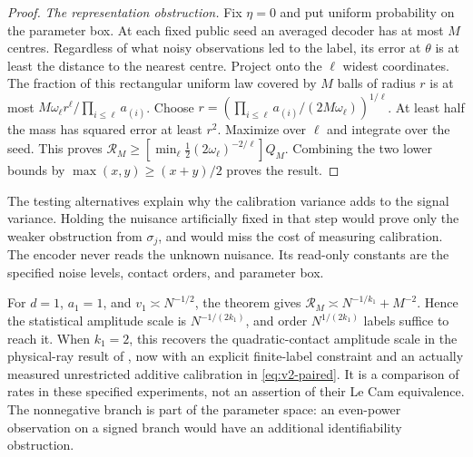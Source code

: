 \begin{proof}
\emph{The representation obstruction.}
Fix $\eta=0$ and put uniform probability on the parameter box. At each
fixed public seed an averaged decoder has at most $M$ centres. Regardless
of what noisy observations led to the label, its error at $\theta$ is
at least the distance to the nearest centre. Project onto the $\ell$
widest coordinates. The fraction of this rectangular uniform law covered
by $M$ balls of radius $r$ is at most
$M\omega_\ell r^\ell/\prod_{i\le\ell}a_{(i)}$.
Choose $r=(\prod_{i\le\ell}a_{(i)}/(2M\omega_\ell))^{1/\ell}$.
At least half the mass has squared error at least $r^2$. Maximize over
$\ell$ and integrate over the seed. This proves
$\mathcal R_M\ge[\min_\ell\tfrac12(2\omega_\ell)^{-2/\ell}]Q_M$.
Combining the two lower bounds by $\max(x,y)\ge(x+y)/2$ proves the result.
\end{proof}

The testing alternatives explain why the calibration variance adds to the
signal variance. Holding the nuisance artificially fixed in that step
would prove only the weaker obstruction from $\sigma_j$, and would miss
the cost of measuring calibration. The encoder never reads the unknown
nuisance. Its read-only constants are the specified noise levels, contact
orders, and parameter box.

For $d=1$, $a_1=1$, and $v_1\asymp N^{-1/2}$, the theorem gives
$\mathcal R_M\asymp N^{-1/k_1}+M^{-2}$. Hence the statistical amplitude
scale is $N^{-1/(2k_1)}$, and order $N^{1/(2k_1)}$ labels suffice to
reach it. When $k_1=2$, this recovers the quadratic-contact amplitude
scale in the physical-ray result of \cite{QiA2}, now with an explicit
finite-label constraint and an actually measured unrestricted additive
calibration in \eqref{eq:v2-paired}. It is a comparison of rates in these
specified experiments, not an assertion of their Le Cam equivalence.
The nonnegative branch is part of the parameter space: an even-power
observation on a signed branch would have an additional identifiability
obstruction.

